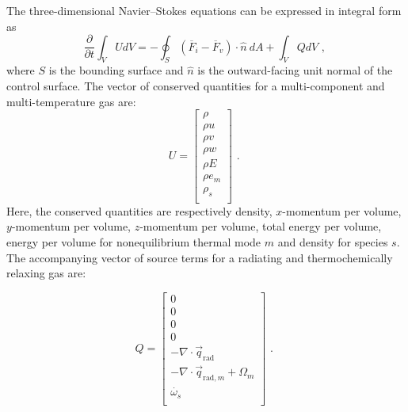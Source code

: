 The three-dimensional Navier--Stokes equations can be expressed in integral form as
\begin{equation}
 \frac{\partial}{\partial t} \int_{V} U dV = - \oint_{S} \left ( \overline{F}_{i} - \overline{F}_{v} \right ) \cdot \hat{n}~dA + \int_{V} Q dV \text{ , }
 \label{eq:conservation}
\end{equation}
where $S$ is the bounding surface and $\hat{n}$ is the outward-facing unit normal of the control surface.
The vector of conserved quantities for a multi-component and multi-temperature gas are:
\begin{equation}
 U = \left [ \begin{array}{c} \rho \\ 
                              \rho u \\ 
                              \rho v \\ 
                              \rho w \\ 
                              \rho E \\ 
                              \rho e_m \\
                              \rho_s \\
             \end{array} \right ] \text{ . }
 \label{eq:U_vector_3D}
\end{equation}
Here, the conserved quantities are respectively density, $x$-momentum per volume,
$y$-momentum per volume, $z$-momentum per volume, total energy per volume, energy per volume for nonequilibrium thermal mode $m$ and density for species $s$.
The accompanying vector of source terms for a radiating and thermochemically relaxing gas are:

\begin{equation}
 Q = \left [  \begin{array}{c} 0 \\ 
                  0 \\ 
                  0 \\ 
                  0 \\ 
                   -\nabla \cdot \vec{q}_\text{rad} \\ 
                   -\nabla \cdot \vec{q}_{\text{rad},m} + \Omega_m \\
                   \dot{\omega_{s}}  \\
             \end{array} \right ] \text{ . }
 \label{eq:U_vector_3D}
\end{equation}

